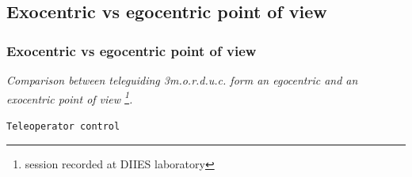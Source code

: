\subsection{Exocentric vs egocentric point of view}
\frame
{
  \frametitle{Exocentric vs egocentric point of view}
  
  \emph{Comparison between teleguiding \textit{3m.o.r.d.u.c.}
    form an egocentric and an exocentric point of view
    \footnote{\tiny{session recorded at DIIES laboratory}}.}
  \pause

  \begin{block} {\alert{\texttt{Teleoperator control}}}

    \vskip5pt
    
    
    
    \vskip5pt


\end{block}}
